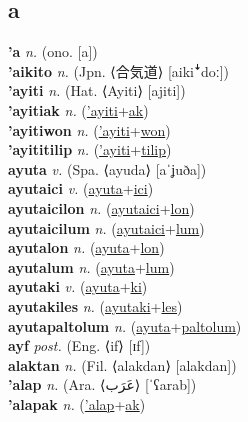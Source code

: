 \subsection{a}

\textbf{'a} \textit{n.} (ono. [a])
 \label{'a} \\
\textbf{'aikito} \textit{n.} (Jpn. ⟨合気道⟩ [aikiꜜdoː])
 \label{'aikito} \\
\textbf{'ayiti} \textit{n.} (Hat. ⟨Ayiti⟩ [ajiti])
 \label{'ayiti} \\
\textbf{'ayitiak} \textit{n.} (\hyperref['ayiti]{'ayiti}+\hyperref[ak]{ak})
 \label{'ayitiak} \\
\textbf{'ayitiwon} \textit{n.} (\hyperref['ayiti]{'ayiti}+\hyperref[won]{won})
 \label{'ayitiwon} \\
\textbf{'ayititilip} \textit{n.} (\hyperref['ayiti]{'ayiti}+\hyperref[tilip]{tilip})
 \label{'ayititilip} \\
\textbf{ayuta} \textit{v.} (Spa. ⟨ayuda⟩ [aˈʝuða])
 \label{ayuta} \\
\textbf{ayutaici} \textit{v.} (\hyperref[ayuta]{ayuta}+\hyperref[ici]{ici})
 \label{ayutaici} \\
\textbf{ayutaicilon} \textit{n.} (\hyperref[ayutaici]{ayutaici}+\hyperref[lon]{lon})
 \label{ayutaicilon} \\
\textbf{ayutaicilum} \textit{n.} (\hyperref[ayutaici]{ayutaici}+\hyperref[lum]{lum})
 \label{ayutaicilum} \\
\textbf{ayutalon} \textit{n.} (\hyperref[ayuta]{ayuta}+\hyperref[lon]{lon})
 \label{ayutalon} \\
\textbf{ayutalum} \textit{n.} (\hyperref[ayuta]{ayuta}+\hyperref[lum]{lum})
 \label{ayutalum} \\
\textbf{ayutaki} \textit{v.} (\hyperref[ayuta]{ayuta}+\hyperref[ki]{ki})
 \label{ayutaki} \\
\textbf{ayutakiles} \textit{n.} (\hyperref[ayutaki]{ayutaki}+\hyperref[les]{les})
 \label{ayutakiles} \\
\textbf{ayutapaltolum} \textit{n.} (\hyperref[ayuta]{ayuta}+\hyperref[paltolum]{paltolum})
 \label{ayutapaltolum} \\
\textbf{ayf} \textit{post.} (Eng. ⟨if⟩ [ɪf])
 \label{ayf} \\
\textbf{alaktan} \textit{n.} (Fil. ⟨alakdan⟩ [alakdan])
 \label{alaktan} \\
\textbf{'alap} \textit{n.} (Ara. ⟨عَرَب⟩ [ˈʕarab])
 \label{'alap} \\
\textbf{'alapak} \textit{n.} (\hyperref['alap]{'alap}+\hyperref[ak]{ak})

